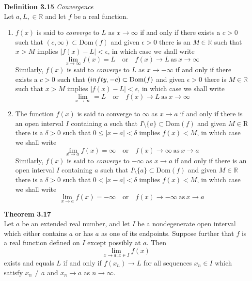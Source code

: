 \documentclass[8pt,landscape]{article}
\begin{document}
\begin{multicols}{3}
    \textbf{Definition 3.15} \emph{Convergence} \\
    Let $a, L, \in \mathbb{R}$ and let $f$ be a real function.
    \begin{enumerate}
        \item $f(x)$ is said to \emph{converge} to $L$ as $x \to \infty$ if and only if
            there exists a $c > 0$ such that $(c, \infty) \subset \mathrm{Dom}(f)$
            and given $\epsilon > 0$ there is an $M \in \mathbb{R}$ such that
            $x > M$ implies $|f(x) - L| < \epsilon$, in which case we shall write
            \[
                \lim_{x \to \infty} f(x) = L \quad \text{or} \quad
                f(x) \to L \ \text{as} \ x \to \infty
            \]
            Similarly, $f(x)$ is said to \emph{converge} to $L$ as $x \to -\infty$
            if and only if there exists a $c > 0$ such that
            $(\-infty, -c) \subset \mathrm{Dom}(f)$ and given $\epsilon > 0$ there is
            $M \in \mathbb{R}$ such that $x > M$ implies $|f(x) - L| < \epsilon$,
            in which case we shall write
            \[
                \lim_{x \to \infty} = L \quad \text{or} \quad
                f(x) \to L \ \text{as} \ x \to \infty
            \]
        \item The function $f(x)$ is said to converge to $\infty$ as $x \to a$
            if and only if there is an open interval $I$ containing $a$ such that
            $I \setminus \{a\} \subset \mathrm{Dom}(f)$ and given $M \in \mathrm{R}$
            there is a $\delta > 0$ such that $0 \leq |x - a| < \delta$ implies
            $f(x) < M$, in which case we shall write
            \[
                \lim_{x \to a} f(x) = \infty \quad \text{or} \quad
                f(x) \to \infty \ \text{as} \ x \to a
            \]
            Similarly, $f(x)$ is said to \emph{converge} to $-\infty$ as $x \to a$
            if and only if there is an open interval $I$ containing $a$ such that
            $I \setminus \{a\} \subset \mathrm{Dom}(f)$ and given $M \in \mathbb{R}$
            there is a $\delta > 0$ such that $0 < |x-a| < \delta$ implies $f(x) < M$,
            in which case we shall write
            \[
                \lim_{x \to a} f(x) = -\infty \quad \text{or} \quad
                f(x) \to -\infty \ \text{as} \ x \to a
            \]
    \end{enumerate}

    \textbf{Theorem 3.17} \\
    Let $a$ be an extended real number, and let $I$ be a nondegenerate open interval which
    either contains $a$ or has $a$ as one of its endpoints.
    Suppose further that $f$ is a real function defined on $I$ except possibly at $a$.
    Then
    \[
        \lim_{x \to a; x \in I} f(x)
    \]
    exists and equals $L$ if and only if $f(x_n) \to L$ for all sequences $x_n \in I$
    which satisfy $x_n \neq a$ and $x_n \to a$ as $n \to \infty$.


\end{multicols}
\end{document}
